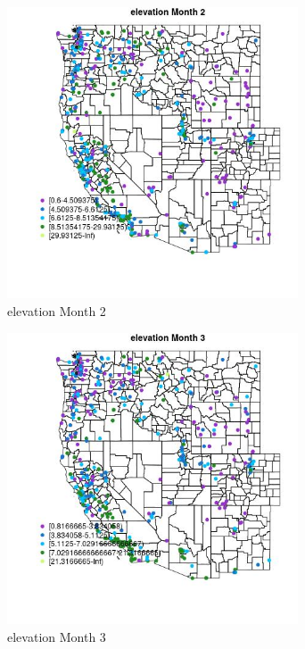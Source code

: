 \begin{figure} 
\centering  
\includegraphics[width=0.77\textwidth]{Code_Outputs/ML_input_report_ML_input_PM25_Step5_part_d_de_duplicated_aves_ML_input_MapObsMo2elevation.jpg} 
\caption{\label{fig:ML_input_report_ML_input_PM25_Step5_part_d_de_duplicated_aves_ML_inputMapObsMo2elevation}elevation Month 2} 
\end{figure} 
 

\begin{figure} 
\centering  
\includegraphics[width=0.77\textwidth]{Code_Outputs/ML_input_report_ML_input_PM25_Step5_part_d_de_duplicated_aves_ML_input_MapObsMo3elevation.jpg} 
\caption{\label{fig:ML_input_report_ML_input_PM25_Step5_part_d_de_duplicated_aves_ML_inputMapObsMo3elevation}elevation Month 3} 
\end{figure} 
 

